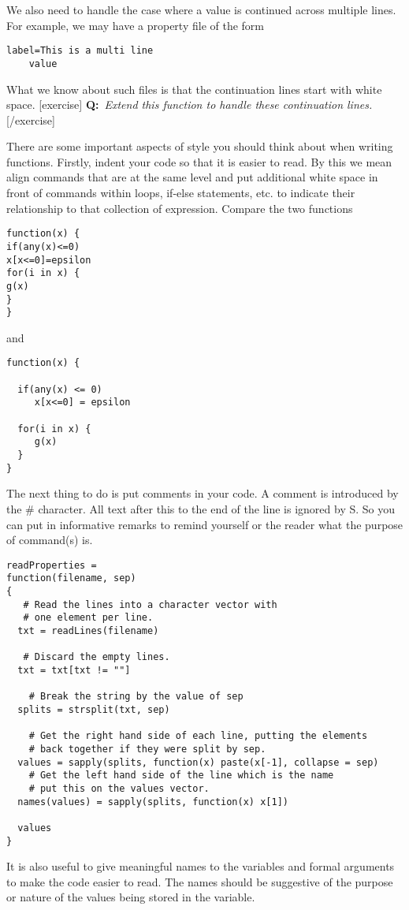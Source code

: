 {We also need to handle the case where a value is continued across
multiple lines. For example, we may have a property file of the form
\begin{verbatim}
label=This is a multi line
    value
\end{verbatim}
What we know about such files is that the continuation lines start
with white space.  [exercise] \textbf{Q:}~\textit{Extend this function
  to handle these continuation lines.}  [/exercise]


There are some important aspects of style you should think about when
writing functions. Firstly, indent your code so that it is easier to
read. By this we mean align commands that are at the same level and
put additional white space in front of commands within loops, if-else
statements, etc. to indicate their relationship to that collection of
expression. Compare the two functions
\begin{verbatim}
function(x) {
if(any(x)<=0)
x[x<=0]=epsilon
for(i in x) {
g(x)
}
}
\end{verbatim}
and 
\begin{verbatim}
function(x) {

  if(any(x) <= 0)
     x[x<=0] = epsilon

  for(i in x) {
     g(x)
  }
}
\end{verbatim}


The next thing to do is put comments in your code. A comment is
introduced by the \# character. All text after this to the end of the
line is ignored by S. So you can put in informative remarks to remind
yourself or the reader what the purpose of command(s) is.
\begin{verbatim}
readProperties =
function(filename, sep) 
{
   # Read the lines into a character vector with
   # one element per line.
  txt = readLines(filename)

   # Discard the empty lines.
  txt = txt[txt != ""]

    # Break the string by the value of sep
  splits = strsplit(txt, sep)

    # Get the right hand side of each line, putting the elements
    # back together if they were split by sep.
  values = sapply(splits, function(x) paste(x[-1], collapse = sep)
    # Get the left hand side of the line which is the name
    # put this on the values vector.
  names(values) = sapply(splits, function(x) x[1])

  values
}
\end{verbatim}


It is also useful to give meaningful names to the variables and formal
arguments to make the code easier to read. The names should be
suggestive of the purpose or nature of the values being stored in the
variable.

}
